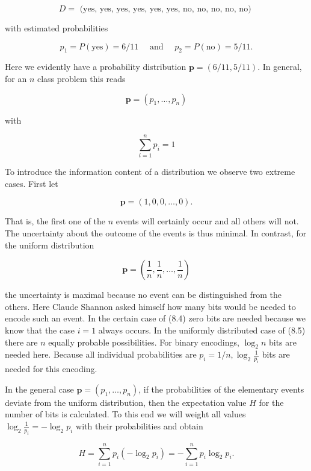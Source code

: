 \documentclass[10pt]{article}
\begin{document}
$$
D=\text { (yes, yes, yes, yes, yes, yes, no, no, no, no, no) }
$$

with estimated probabilities

$$
p_{1}=P(\mathrm{yes})=6 / 11 \quad \text { and } \quad p_{2}=P(\mathrm{no})=5 / 11 .
$$

Here we evidently have a probability distribution $\boldsymbol{p}=(6 / 11,5 / 11)$. In general, for an $n$ class problem this reads

$$
\boldsymbol{p}=\left(p_{1}, \ldots, p_{n}\right)
$$

with

$$
\sum_{i=1}^{n} p_{i}=1
$$

To introduce the information content of a distribution we observe two extreme cases. First let


\begin{equation*}
\boldsymbol{p}=(1,0,0, \ldots, 0) . \tag{8.4}
\end{equation*}


That is, the first one of the $n$ events will certainly occur and all others will not. The uncertainty about the outcome of the events is thus minimal. In contrast, for the uniform distribution


\begin{equation*}
\boldsymbol{p}=\left(\frac{1}{n}, \frac{1}{n}, \ldots, \frac{1}{n}\right) \tag{8.5}
\end{equation*}


the uncertainty is maximal because no event can be distinguished from the others. Here Claude Shannon asked himself how many bits would be needed to encode such an event. In the certain case of (8.4) zero bits are needed because we know that the case $i=1$ always occurs. In the uniformly distributed case of (8.5) there are $n$ equally probable possibilities. For binary encodings, $\log _{2} n$ bits are needed here. Because all individual probabilities are $p_{i}=1 / n, \log _{2} \frac{1}{p_{i}}$ bits are needed for this encoding.

In the general case $\boldsymbol{p}=\left(p_{1}, \ldots, p_{n}\right)$, if the probabilities of the elementary events deviate from the uniform distribution, then the expectation value $H$ for the number of bits is calculated. To this end we will weight all values $\log _{2} \frac{1}{p_{i}}=-\log _{2} p_{i}$ with their probabilities and obtain

$$
H=\sum_{i=1}^{n} p_{i}\left(-\log _{2} p_{i}\right)=-\sum_{i=1}^{n} p_{i} \log _{2} p_{i} .
$$
\end{document}
